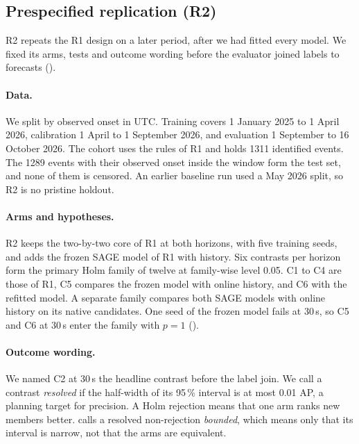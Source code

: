 \subsection{Prespecified replication (R2)}\label{sec:forecast-newperiod}

R2 repeats the R1 design on a later period, after we had fitted every model.
We fixed its arms, tests and outcome wording before the evaluator joined labels to forecasts ().

\paragraph{Data.}
We split by observed onset in UTC.
Training covers 1 January 2025 to 1 April 2026, calibration 1 April to 1 September 2026, and evaluation 1 September to 16 October 2026.
The cohort uses the rules of R1 and holds \num{1311} identified events.
The \num{1289} events with their observed onset inside the window form the test set, and none of them is censored.
An earlier baseline run used a May 2026 split, so R2 is no pristine holdout.

\paragraph{Arms and hypotheses.}
R2 keeps the two-by-two core of R1 at both horizons, with five training seeds, and adds the frozen SAGE model of R1 with history.
Six contrasts per horizon form the primary Holm family of twelve at family-wise level 0.05.
C1 to C4 are those of R1, C5 compares the frozen model with online history, and C6 with the refitted model.
A separate family compares both SAGE models with online history on its native candidates.
One seed of the frozen model fails at 30\,s, so C5 and C6 at 30\,s enter the family with $p=1$ ().

\paragraph{Outcome wording.}
We named C2 at 30\,s the headline contrast before the label join.
We call a contrast \emph{resolved} if the half-width of its 95\,\% interval is at most 0.01 AP, a planning target for precision.
A Holm rejection means that one arm ranks new members better.
 calls a resolved non-rejection \emph{bounded}, which means only that its interval is narrow, not that the arms are equivalent.

